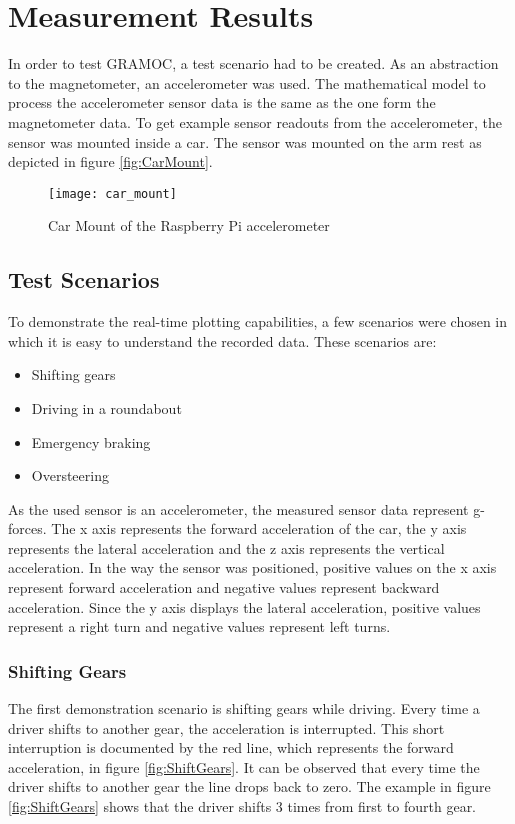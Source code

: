 \chapter{Measurement Results}
\label{ch:MeasureRes}

\author{Nico Leidenfrost}
%
In order to test GRAMOC, a test scenario had to be created. As an abstraction to the magnetometer, an accelerometer was used. The mathematical model to process the accelerometer sensor data is the same as the one form the magnetometer data. To get example sensor readouts from the accelerometer, the sensor was mounted inside a car. The sensor was mounted on the arm rest as depicted in figure \vref{fig:CarMount}.

\begin{figure}[h]
    \centering
    \texttt{[image: car\_mount]}
    \caption{Car Mount of the Raspberry Pi accelerometer}
    \label{fig:CarMount}
\end{figure}

\section{Test Scenarios}
To demonstrate the real-time plotting capabilities, a few scenarios were chosen in which it is easy to understand the recorded data. These scenarios are:

\begin{itemize}
    \item Shifting gears
    \item Driving in a roundabout
    \item Emergency braking
    \item Oversteering
\end{itemize}

As the used sensor is an accelerometer, the measured sensor data represent g-forces. The x axis represents the forward acceleration of the car, the y axis represents the lateral acceleration and the z axis represents the vertical acceleration. In the way the sensor was positioned, positive values on the x axis represent forward acceleration and negative values represent backward acceleration. Since the y axis displays the lateral acceleration, positive values represent a right turn and negative values represent left turns.

\subsection{Shifting Gears}
The first demonstration scenario is shifting gears while driving. Every time a driver shifts to another gear, the acceleration is interrupted. This short interruption is documented by the red line, which represents the forward acceleration, in figure \vref{fig:ShiftGears}. It can be observed that every time the driver shifts to another gear the line drops back to zero. The example in figure \vref{fig:ShiftGears} shows that the driver shifts 3 times from  first to fourth gear.

